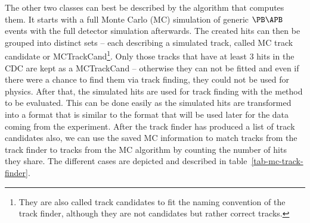 The other two classes can best be described by the algorithm that computes them. It starts with a full Monte Carlo (MC) simulation of generic $\PB\APB$ events with the full detector simulation afterwards. The created hits can then be grouped into distinct sets -- each describing a simulated track, called MC track candidate or MCTrackCand\footnote{They are also called track candidates to fit the naming convention of the track finder, although they are not candidates but rather correct tracks.}. Only those tracks that have at least 3 hits in the CDC are kept as a MCTrackCand -- otherwise they can not be fitted and even if there were a chance to find them via track finding, they could not be used for physics. After that, the simulated hits are used for track finding with the method to be evaluated. This can be done easily as the simulated hits are transformed into a format that is similar to the format that will be used later for the data coming from the experiment. After the track finder has produced a list of track candidates also, we can use the saved MC information to match tracks from the track finder to tracks from the MC algorithm by counting the number of hits they share. The different cases are depicted and described in table~\ref{tab-mc-track-finder}.

